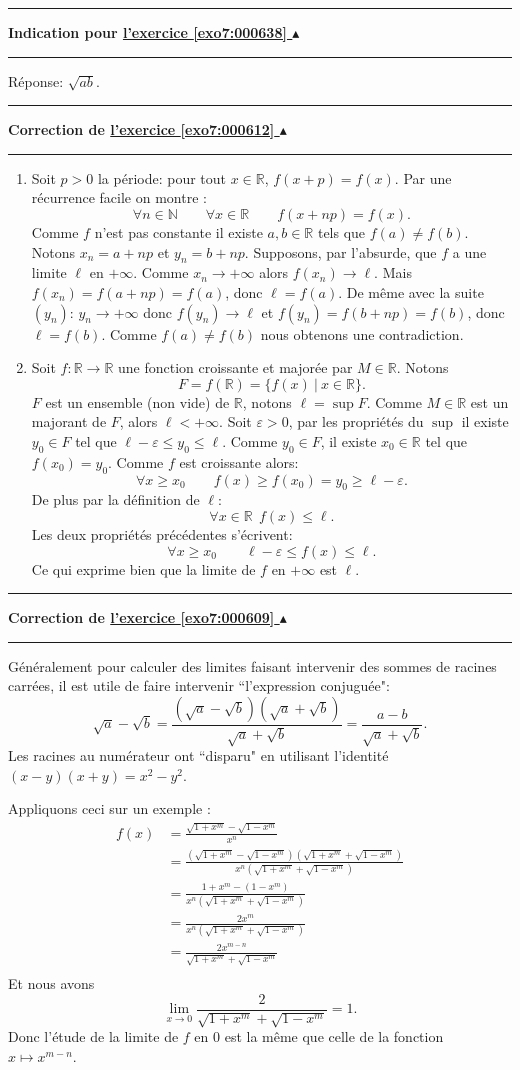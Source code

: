 \documentclass[11pt,a4paper]{article}
\newcommand{\Nn}{\mathbb{N}} \newcommand{\N}{\mathbb{N}}
\newcommand{\Rr}{\mathbb{R}} \newcommand{\R}{\mathbb{R}}
\renewcommand{\epsilon}{\varepsilon}
\newcommand{\noindication}{}
\newcounter{exo}
\newcommand{\indication}[1]{\hypertarget{ind7:#1}{}\label{ind7:#1}{\bf Indication pour \hyperlink{exo7:#1}{l'exercice \ref{exo7:#1} $\blacktriangle$}}\vspace{1mm}\hrule\vspace{1mm}}
\newcommand{\finindication}{\vspace{1mm}\hrule\vspace*{7mm}}
\newcommand{\correction}[1]{\hypertarget{cor7:#1}{}\label{cor7:#1}{\bf Correction de \hyperlink{exo7:#1}{l'exercice \ref{exo7:#1} $\blacktriangle$}}\vspace{1mm}\hrule\vspace{1mm}}
\newcommand{\fincorrection}{\vspace{1mm}\hrule\vspace*{7mm}}
\begin{document}
\finindication
\indication{000638}
R\'{e}ponse: $\sqrt{ab}$.
\finindication
\noindication


\newpage

\correction{000612}
\begin{enumerate}
  \item Soit $p>0$ la p\'eriode: pour tout $x\in \Rr$,
$f(x+p) = f(x)$. Par une r\'ecurrence facile on montre :
$$ \forall n \in \Nn \qquad \forall x\in \Rr \qquad f(x+np)=f(x).$$
Comme $f$ n'est pas constante il existe $a,b \in \Rr$ tels que $f(a)\not= f(b)$. Notons $x_n = a +np$ et $y_n = b+np$.
Supposons, par l'absurde, que $f$ a une limite $\ell$ en $+\infty$.
Comme $x_n \rightarrow +\infty$ alors $f(x_n) \rightarrow \ell$.
Mais $f(x_n) = f(a +np) = f(a)$, donc $\ell = f(a)$. 
De m\^eme avec la suite $(y_n)$: $y_n \rightarrow +\infty$ donc $f(y_n) \rightarrow \ell$ et $f(y_n) = f(b +np) = f(b)$, donc $\ell = f(b)$. 
Comme $f(a) \not= f(b)$ nous obtenons une contradiction.
  \item Soit $f: \Rr \longrightarrow \Rr$ une fonction croissante et major\'ee par $M\in \Rr$. 
Notons 
$$ F = f(\Rr) = \{ f(x) \ | \ x \in \Rr \}.$$
$F$ est un ensemble (non vide) de $\Rr$, notons $\ell = \sup F$.
Comme $M\in \Rr$ est un majorant de $F$, alors
$\ell < +\infty$.
Soit $\epsilon > 0$, par les propri\'et\'es du $\sup$
il existe $y_0 \in F$ tel que $\ell - \epsilon \leq y_0 \leq \ell$.
Comme $y_0\in F$, il existe $x_0 \in \Rr$ tel que $f(x_0) = y_0$.
Comme $f$ est croissante alors:
$$ \forall x\geq x_0 \qquad f(x) \geq f(x_0) = y_0 \geq \ell - \epsilon.$$
De plus par la d\'efinition de $\ell$:
$$\forall x\in \Rr \ \ f(x) \leq \ell.$$
Les deux propri\'et\'es pr\'ec\'edentes s'\'ecrivent:
$$ \forall x\geq x_0 \qquad \ell - \epsilon \leq f(x) \leq \ell.$$
Ce qui exprime bien que la limite de $f$ en $+\infty$ est $\ell$.
\end{enumerate}
\fincorrection
\correction{000609}
 G\'en\'eralement pour calculer des limites faisant intervenir des sommes de racines carr\'ees,  il est utile de faire intervenir ``l'expression conjugu\'ee": 
$$\sqrt a - \sqrt b = \frac{(\sqrt a - \sqrt b)(\sqrt a + \sqrt b)}{\sqrt a + \sqrt b} = \frac{a-b}{\sqrt a + \sqrt b}.$$
Les racines au num\'erateur ont ``disparu" en utilisant l'identit\'e
$(x-y)(x+y) = x^2-y^2$.

Appliquons ceci sur un exemple :
\begin{align*}
 f(x) &= 
  \frac{\sqrt{1+x^m}-\sqrt{1-x^m}}{x^n} \\
     &=  \frac{(\sqrt{1+x^m}-\sqrt{1-x^m})(\sqrt{1+x^m}+\sqrt{1-x^m})}{x^n(\sqrt{1+x^m}+\sqrt{1-x^m})} \\
   &= \frac{1+x^m-(1-x^m)}{x^n(\sqrt{1+x^m}+\sqrt{1-x^m})}  \\
   &= \frac{2x^m}{x^n(\sqrt{1+x^m}+\sqrt{1-x^m})}  \\
   &= \frac{2x^{m-n}}{\sqrt{1+x^m}+\sqrt{1-x^m}}  \\
\end{align*}
Et nous avons 
$$ \lim_{x \rightarrow 0} \frac 2 {\sqrt{1+x^m}+\sqrt{1-x^m}} = 1.$$
Donc l'\'etude de la limite de $f$ en $0$ est la m\^eme que celle de la fonction $x \mapsto x^{m-n}$.
\end{document}
